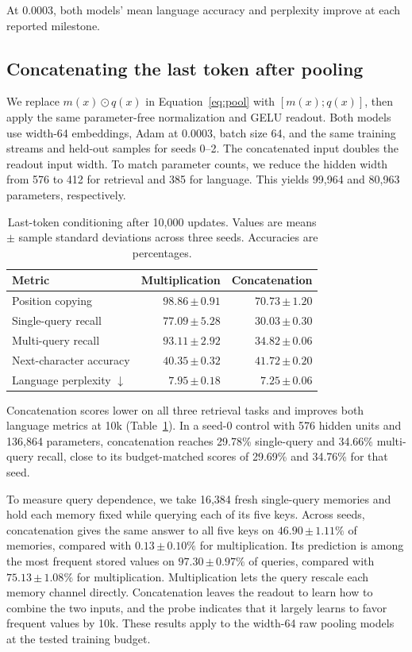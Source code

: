 \documentclass[11pt]{article}
\newcommand{\sd}[2]{#1\,{\scriptstyle\pm\,#2}}
\begin{document}
At 0.0003, both models' mean language accuracy and perplexity improve at each reported milestone.

\subsection{Concatenating the last token after pooling}
We replace \(m(x)\odot q(x)\) in Equation~\ref{eq:pool} with
\([m(x);q(x)]\), then apply the same parameter-free normalization and GELU
readout. Both models use width-64 embeddings, Adam at 0.0003, batch size 64,
and the same training streams and held-out samples for seeds 0--2.
The concatenated input doubles the readout input width. To match parameter
counts, we reduce the hidden width from 576 to 412 for retrieval and 385 for
language. This yields 99,964 and 80,963 parameters, respectively.

\begin{table}[htbp]
\centering\small
\caption{Last-token conditioning after 10,000 updates. Values are means
$\pm$ sample standard deviations across three seeds. Accuracies are percentages.}
\label{tab:last-token-concat}
\begin{tabular}{lrr}
\toprule
Metric & Multiplication & Concatenation\\
\midrule
Position copying & \(\sd{98.86}{0.91}\) & \(\sd{70.73}{1.20}\)\\
Single-query recall & \(\sd{77.09}{5.28}\) & \(\sd{30.03}{0.30}\)\\
Multi-query recall & \(\sd{93.11}{2.92}\) & \(\sd{34.82}{0.06}\)\\
Next-character accuracy & \(\sd{40.35}{0.32}\) & \(\sd{41.72}{0.20}\)\\
Language perplexity \(\downarrow\) & \(\sd{7.95}{0.18}\) & \(\sd{7.25}{0.06}\)\\
\bottomrule
\end{tabular}
\end{table}

Concatenation scores lower on all three retrieval tasks and improves both
language metrics at 10k (Table~\ref{tab:last-token-concat}). In a seed-0
control with 576 hidden units and 136,864 parameters, concatenation reaches
29.78\% single-query and 34.66\% multi-query recall, close to its
budget-matched scores of 29.69\% and 34.76\% for that seed.

To measure query dependence, we take 16,384 fresh single-query memories and
hold each memory fixed while querying each of its five keys. Across seeds,
concatenation gives the same answer to all five keys on
\(\sd{46.90}{1.11}\%\) of memories, compared with \(\sd{0.13}{0.10}\%\)
for multiplication. Its prediction is among the most frequent stored
values on \(\sd{97.30}{0.97}\%\) of queries, compared with
\(\sd{75.13}{1.08}\%\) for multiplication. Multiplication lets the query
rescale each memory channel directly. Concatenation leaves the readout to
learn how to combine the two inputs, and the probe indicates that it
largely learns to favor frequent values by 10k. These results apply to the
width-64 raw pooling models at the tested training budget.
\end{document}
